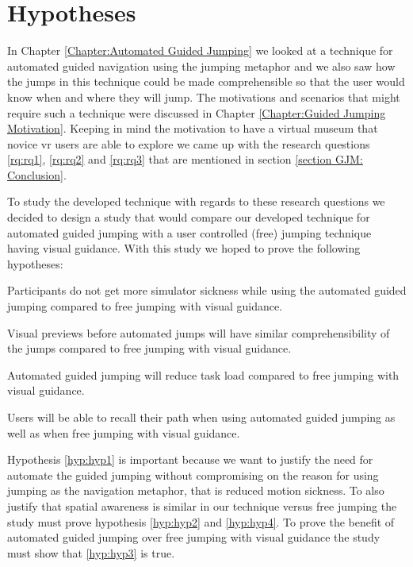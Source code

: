 \label{Chapter:Design and Procedure of the User Study}
\section{Hypotheses}
\label{section DPUS: Hypotheses}
In Chapter \ref{Chapter:Automated Guided Jumping} we looked at a technique for automated guided navigation using the jumping metaphor and we also saw how the jumps in this technique could be made comprehensible so that the user would know when and where they will jump. The motivations and scenarios that might require such a technique were discussed in Chapter \ref{Chapter:Guided Jumping Motivation}. Keeping in mind the motivation to have a virtual museum that novice \acrshort{vr} users are able to explore we came up with the research questions \cref{rq:rq1}, \cref{rq:rq2} and \cref{rq:rq3} that are mentioned in section \ref{section GJM: Conclusion}.

To study the developed technique with regards to these research questions we decided to design a study that would compare our developed technique for automated guided jumping with a user controlled (free) jumping technique having visual guidance. With this study we hoped to prove the following hypotheses:

\begin{hypothesis}
	\label{hyp:hyp1}
	Participants do not get more simulator sickness while using the automated guided jumping compared to free jumping with visual guidance.
\end{hypothesis}
\begin{hypothesis}
	\label{hyp:hyp2}
	Visual previews before automated jumps will have similar comprehensibility of the jumps compared to free jumping with visual guidance.
\end{hypothesis}
\begin{hypothesis}
	\label{hyp:hyp3}
	Automated guided jumping will reduce task load compared to free jumping with visual guidance.
\end{hypothesis}
\begin{hypothesis}
	\label{hyp:hyp4}
	Users will be able to recall their path when using automated guided jumping as well as when free jumping with visual guidance.
\end{hypothesis}

Hypothesis \cref{hyp:hyp1} is important because we want to justify the need for automate the guided jumping without compromising on the reason for using jumping as the navigation metaphor, that is reduced motion sickness. To also justify that spatial awareness is similar in our technique versus free jumping the study must prove hypothesis \cref{hyp:hyp2} and \cref{hyp:hyp4}. To prove the benefit of automated guided jumping over free jumping with visual guidance the study must show that \cref{hyp:hyp3} is true.  

